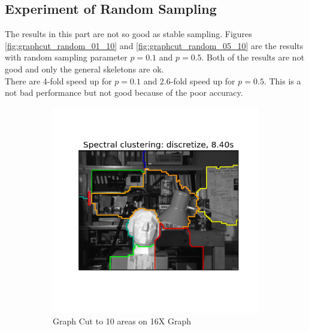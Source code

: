 \subsection{Experiment of Random Sampling}
The results in this part are not so good as stable sampling. Figures \ref{fig:graphcut_random_01_10} and \ref{fig:graphcut_random_05_10} are the results with random sampling parameter $p = 0.1$ and $p = 0.5$. Both of the results are not good and only the general skeletons are ok. \\
There are 4-fold speed up for $p = 0.1$ and 2.6-fold speed up for $p = 0.5$. This is a not bad performance but not good because of the poor accuracy.
\begin{figure}[h!]
        \centering
        \begin{subfigure}[h]{0.48\textwidth}
                \includegraphics[width=\textwidth]{fig/592_small4_10.png}
                \caption{Graph Cut to 10 areas on 16X Graph}
                \label{fig:graphcut_random_small4_10}
        \end{subfigure}
        \begin{subfigure}[h]{0.48\textwidth}

\end{subfigure}
\end{figure}
